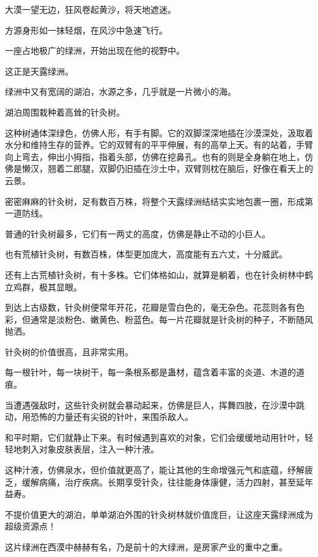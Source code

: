 
\begin{this_body}

大漠一望无边，狂风卷起黄沙，将天地遮迷。

方源身形如一抹轻烟，在风沙中急速飞行。

一座占地极广的绿洲，开始出现在他的视野中。

这正是天露绿洲。

绿洲中又有宽阔的湖泊，水源之多，几乎就是一片微小的海。

湖泊周围栽种着高耸的针灸树。

这种树通体深绿色，仿佛人形，有手有脚。它的双脚深深地插在沙漠深处，汲取着水分和维持生存的营养。它的双臂有的平平伸展，有的高举上天。有的站着，手臂向上弯去，伸出小拇指，指着头部，仿佛在挖鼻孔。也有的则是全身躺在地上，仿佛是懒汉，翘着二郎腿，双脚仍旧插在沙土中，双臂则枕在脑后，好像在看天上的云景。

密密麻麻的针灸树，足有数百万株，将整个天露绿洲结结实实地包裹一圈，形成第一道防线。

普通的针灸树最多，它们有一两丈的高度，仿佛是静止不动的小巨人。

也有荒植针灸树，有数百株，体型更加庞大，高度能有五六丈，十分威武。

还有上古荒植针灸树，有十多株。它们体格如山，就算是躺着，也在针灸树林中鹤立鸡群，极其显眼。

到达上古级数，针灸树便常年开花，花瓣是雪白色的，毫无杂色。花蕊则各有色彩，但通常是淡粉色、嫩黄色、粉蓝色。每一片花瓣就是针灸树的种子，不断随风抛洒。

针灸树的价值很高，且非常实用。

每一根针叶，每一块树干，每一条根系都是蛊材，蕴含着丰富的炎道、木道的道痕。

当遭遇强敌时，这些针灸树就会暴动起来，仿佛是巨人，挥舞四肢，在沙漠中跳动，用恐怖的力量还有尖锐的针叶，来围杀敌人。

和平时期，它们就静止下来。有时候遇到喜欢的对象，它们会缓缓地动用针叶，轻轻地刺入对象皮肤表层，注入一种汁液。

这种汁液，仿佛泉水，但价值就更高了，能让其他的生命增强元气和底蕴，纾解疲乏，缓解病痛，治疗疾病。长期享受针灸，往往能身体康健，活力四射，甚至延年益寿。

不提价值更大的湖泊，单单湖泊外围的针灸树林就价值庞巨，让这座天露绿洲成为超级资源点！

这片绿洲在西漠中赫赫有名，乃是前十的大绿洲，是房家产业的重中之重。


\end{this_body}
